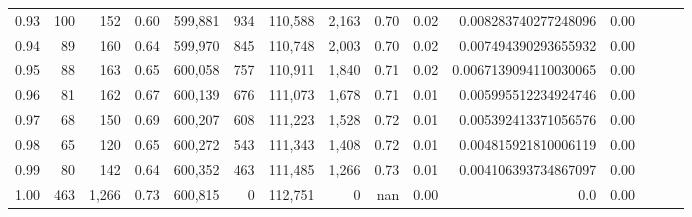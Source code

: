 \begin{tabular}{rrrrrrrrrrrrrrr}
0.93 &     100 &    152 &  0.60 &  599,881 &      934 &  110,588 &    2,163 &  0.70 &  0.02 &   0.008283740277248096 &      0.00 \\
0.94 &      89 &    160 &  0.64 &  599,970 &      845 &  110,748 &    2,003 &  0.70 &  0.02 &   0.007494390293655932 &      0.00 \\
0.95 &      88 &    163 &  0.65 &  600,058 &      757 &  110,911 &    1,840 &  0.71 &  0.02 &  0.0067139094110030065 &      0.00 \\
0.96 &      81 &    162 &  0.67 &  600,139 &      676 &  111,073 &    1,678 &  0.71 &  0.01 &   0.005995512234924746 &      0.00 \\
0.97 &      68 &    150 &  0.69 &  600,207 &      608 &  111,223 &    1,528 &  0.72 &  0.01 &   0.005392413371056576 &      0.00 \\
0.98 &      65 &    120 &  0.65 &  600,272 &      543 &  111,343 &    1,408 &  0.72 &  0.01 &   0.004815921810006119 &      0.00 \\
0.99 &      80 &    142 &  0.64 &  600,352 &      463 &  111,485 &    1,266 &  0.73 &  0.01 &   0.004106393734867097 &      0.00 \\
1.00 &     463 &  1,266 &  0.73 &  600,815 &        0 &  112,751 &        0 &   nan &  0.00 &                    0.0 &      0.00 \\
\bottomrule
\end{tabular}
